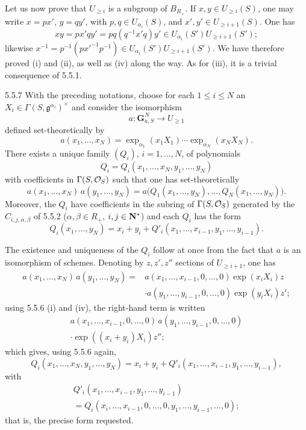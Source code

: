 Let us now prove that $U_{\ge i}$ is a subgroup of $B_{R_+}$. If $x,y\in U_{\ge i}(S)$, one may write $x=px'$, $y=qy'$, with $p,q\in U_{\alpha_i}(S)$, and $x',y'\in U_{\ge i+1}(S)$. One has
\[
xy=px'qy'=pq(q^{-1}x'q)y'\in U_{\alpha_i}(S')U_{\ge i+1}(S');
\]
likewise $x^{-1}=p^{-1}(px'^{-1}p^{-1})\in U_{\alpha_i}(S')U_{\ge i+1}(S')$. We have therefore proved (i) and (ii), as well as (iv) along the way. As for (iii), it is a trivial consequence of 5.5.1.
\begin{lemma}{5.5.7}\label{XXII.5.5.7}
With the preceding notations, choose for each $1\le i\le N$ an $X_i\in\Gamma(S,\mathfrak g^{\alpha_i})^\times$ and consider the isomorphism
\[
a:\mathbf G_{a,S}^N\to U_{\ge1}
\]
defined set-theoretically by
\[
a(x_1,\ldots,x_N)=\exp_{\alpha_1}(x_1X_1)\cdots\exp_{\alpha_N}(x_NX_N).
\]
There exists a unique family $(Q_i)$, $i=1,\ldots,N$, of polynomials
\[
Q_i=Q_i(x_1,\ldots,x_N,y_1,\ldots,y_N)
\]
with coefficients in $\Gamma(S,\mathcal{O}_S)$ such that one has set-theoretically
\[
a(x_1,\ldots,x_N)\,a(y_1,\ldots,y_N)=a\bigl(Q_1(x_1,\ldots,y_N),\ldots,Q_N(x_1,\ldots,y_N)\bigr).
\]
Moreover, the $Q_i$ have coefficients in the subring of $\Gamma(S,\mathcal{O}_S)$ generated by the $C_{i,j,\alpha,\beta}$ of 5.5.2 ($\alpha,\beta\in R_+$, $i,j\in\mathbf{N}^*$) and each $Q_i$ has the form
\[
Q_i(x_1,\ldots,y_N)=x_i+y_i+Q'_i(x_1,\ldots,x_{i-1},y_1,\ldots,y_{i-1}).
\]
\end{lemma}
The existence and uniqueness of the $Q_i$ follow at once from the fact that $a$ is an isomorphism of schemes. Denoting by $z,z',z''$ sections of $U_{\ge i+1}$, one has
\[
\begin{aligned}
a(x_1,\ldots,x_N)\,a(y_1,\ldots,y_N)={}&a(x_1,\ldots,x_{i-1},0,\ldots,0)\exp(x_iX_i)z\\
&\cdot a(y_1,\ldots,y_{i-1},0,\ldots,0)\exp(y_iX_i)z';
\end{aligned}
\]
using 5.5.6 (i) and (iv), the right-hand term is written
\[
\begin{gathered}
a(x_1,\ldots,x_{i-1},0,\ldots,0)\,a(y_1,\ldots,y_{i-1},0,\ldots,0)\\
\cdot\exp((x_i+y_i)X_i)z'';
\end{gathered}
\]
which gives, using 5.5.6 again,
\[
Q_i(x_1,\ldots,x_N,y_1,\ldots,y_N)=x_i+y_i+Q'_i(x_1,\ldots,x_{i-1},y_1,\ldots,y_{i-1}),
\]
with
\[
\begin{gathered}
Q'_i(x_1,\ldots,x_{i-1},y_1,\ldots,y_{i-1})\\
=Q_i(x_i,\ldots,x_{i-1},0,\ldots,0,y_1,\ldots,y_{i-1},\ldots,0);
\end{gathered}
\]
that is, the precise form requested.

